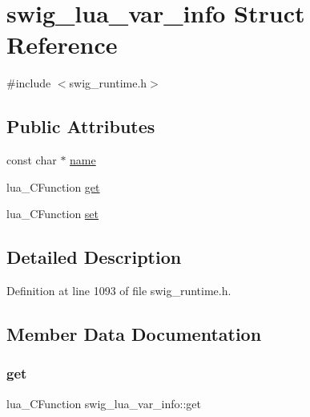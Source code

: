\hypertarget{structswig__lua__var__info}{}\section{swig\+\_\+lua\+\_\+var\+\_\+info Struct Reference}
\label{structswig__lua__var__info}


{\ttfamily \#include $<$swig\+\_\+runtime.\+h$>$}

\subsection*{Public Attributes}
\begin{DoxyCompactItemize}
\item 
const char $\ast$ \mbox{\hyperlink{structswig__lua__var__info_a59daefcace30c1ffb1f58bd7829f8449}{name}}
\item 
lua\+\_\+\+C\+Function \mbox{\hyperlink{structswig__lua__var__info_a56fb0b689f37015e340b35c6d7ee0b99}{get}}
\item 
lua\+\_\+\+C\+Function \mbox{\hyperlink{structswig__lua__var__info_aea961df3cc15877e8354cb535bef2c1e}{set}}
\end{DoxyCompactItemize}


\subsection{Detailed Description}


Definition at line 1093 of file swig\+\_\+runtime.\+h.



\subsection{Member Data Documentation}
\mbox{\label{structswig__lua__var__info_a56fb0b689f37015e340b35c6d7ee0b99}} 
\subsubsection{\texorpdfstring{get}{get}}
{\footnotesize\ttfamily lua\+\_\+\+C\+Function swig\+\_\+lua\+\_\+var\+\_\+info\+::get}



